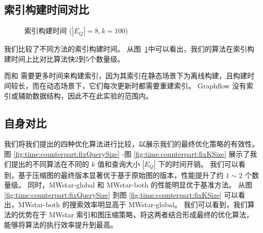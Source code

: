\subsection{索引构建时间对比}
\label{ch5:index-construction}
\begin{figure}[h!]
    \centering
    \caption{索引构建时间  ($|E_Q|=8, k=100$)}
    \label{fig:exp:time:index}
\end{figure}    
我们比较了不同方法的索引构建时间。
从图~\ref{fig:exp:time:index}中可以看出，我们的算法在索引构建时间上比对比算法快2到5个数量级。

而\pm 和 \itk 需要更多时间来构建索引，因为其索引在静态场景下为离线构建，且构建时间较长，而在动态场景下，它们每次更新时都需要重建索引。
Graphflow 没有索引或辅助数据结构，因此不在此实验的范围内。


\subsection{自身对比}
\label{ch5:couterparts}




\label{sec:couterparts}
我们将我们提出的四种优化算法进行比较，以展示我们的最终优化策略的有效性。
图 \ref{fig:time:counterpart:fixQuerySize} -图 \ref{fig:time:counterpart:fixKSize} 展示了我们提出的不同算法在不同的 $k$ 值和查询大小 $|E_Q|$ 下的时间开销。
我们可以看到，基于压缩图的最终版本显著优于基于原始图的版本，性能提升了约 $1{\sim}2$ 个数量级。
同时，MWstar-global 和 MWstar-both 的性能明显优于基准方法。
从图 \ref{fig:time:counterpart:fixQuerySize} 到图 \ref{fig:time:counterpart:fixKSize} 可以看出，MWstar-both 的搜索效率明显高于 MWstar-global。
我们可以看到，我们算法的优势在于 MWstar 索引和图压缩策略，将这两者结合形成最终的优化算法，能够将算法的执行效率提升到最高。

